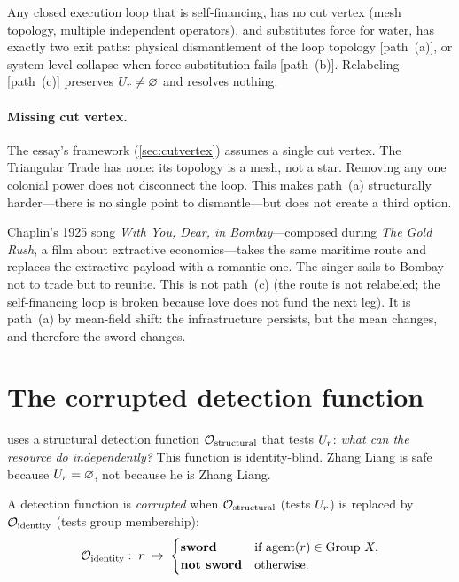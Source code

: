 \begin{theorem}\label{thm:triangle}
Any closed execution loop that is self-financing, has no cut vertex
(mesh topology, multiple independent operators), and substitutes
force for water, has exactly two exit paths: physical dismantlement
of the loop topology [path~(a)], or system-level collapse when
force-substitution fails [path~(b)]. Relabeling [path~(c)] preserves
$U_r \neq \varnothing$ and resolves nothing.
\end{theorem}

\paragraph{Missing cut vertex.}
The essay's framework (\cref{sec:cutvertex}) assumes a single cut
vertex. The Triangular Trade has none: its topology is a mesh, not a
star. Removing any one colonial power does not disconnect the loop.
This makes path~(a) structurally harder---there is no single point to
dismantle---but does not create a third option.

\begin{remark}\label{rem:chaplin}
Chaplin's 1925 song \emph{With You, Dear, in Bombay}---composed during
\emph{The Gold Rush}, a film about extractive economics---takes the same
maritime route and replaces the extractive payload with a romantic one.
The singer sails to Bombay not to trade but to reunite. This is not
path~(c) (the route is not relabeled; the self-financing loop is broken
because love does not fund the next leg). It is path~(a) by mean-field
shift: the infrastructure persists, but the mean changes, and therefore
the sword changes.
\end{remark}

\section{The corrupted detection function}\label{sec:nazi}

 uses a structural detection function
$\mathcal{O}_{\mathrm{structural}}$ that tests $U_r$: \emph{what can the
resource do independently?} This function is identity-blind. Zhang
Liang is safe because $U_r = \varnothing$, not because he is Zhang
Liang.

\begin{definition}\label{def:corruption}
A detection function is \emph{corrupted} when $\mathcal{O}_{\mathrm{structural}}$
(tests $U_r$) is replaced by $\mathcal{O}_{\mathrm{identity}}$ (tests group
membership):
\[
  \mathcal{O}_{\mathrm{identity}}:\;
  r \;\mapsto\;
  \begin{cases}
    \textbf{sword} & \text{if } \mathrm{agent}(r) \in \text{Group } X, \\
    \textbf{not sword} & \text{otherwise.}
  \end{cases}
\]
\end{definition}

